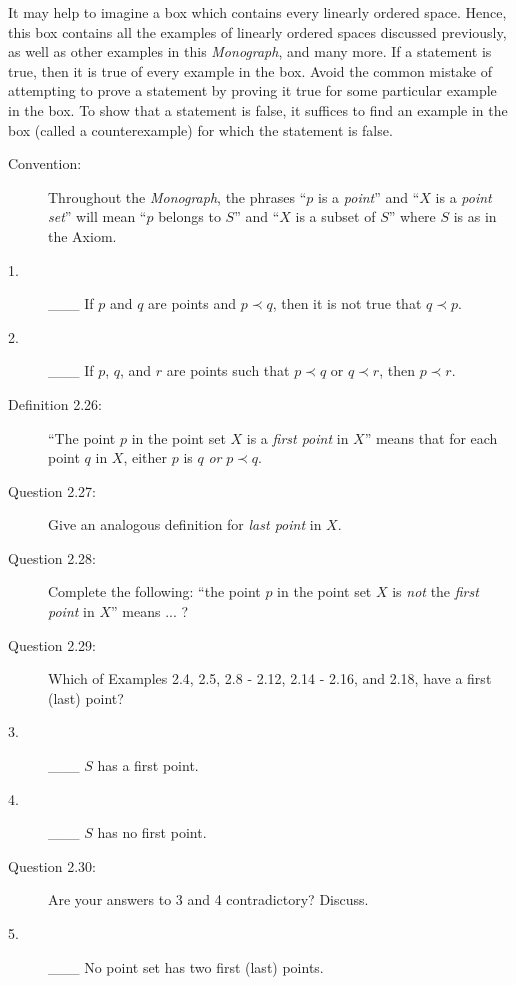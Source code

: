 \documentclass{book}
\begin{document}
It may help to imagine a box which contains every linearly ordered space. Hence, this box contains all the examples of linearly ordered spaces discussed previously, as well as other examples in this \emph{Monograph}, and many more. If a statement is true, then it is true of every example in the box. Avoid the common mistake of attempting to prove a statement by proving it true for some particular example in the box. To show that a statement is false, it suffices to find an example in the box (called a counterexample) for which the statement is false.

\begin{description}

\item[Convention:] Throughout the \emph{Monograph}, the phrases ``$p$ is a \emph{point}'' and ``$X$ is a \emph{point set}'' will mean ``$p$ belongs to $S$'' and ``$X$ is a subset of $S$'' where $S$ is as in the Axiom.

\item[1.] \_\_\_ If $p$ and $q$ are points and $p \prec q$, then it is not true that $q \prec p$.

\item[2.] \_\_\_ If $p$, $q$, and $r$ are points such that $p \prec q$ or $q \prec r$, then $p \prec r$.

\item[Definition 2.26:] ``The point $p$ in the point set $X$ is a \emph{first point} in $X$'' means that for each point $q$ in $X$, either $p$ is $q$ \emph{or} $p \prec q$.

\item[Question 2.27:] Give an analogous definition for \emph{last point} in $X$.

\item[Question 2.28:] Complete the following: ``the point $p$ in the point set $X$ is \emph{not} the \emph{first point} in $X$'' means ... ?

\item[Question 2.29:] Which of Examples 2.4, 2.5, 2.8 - 2.12, 2.14 - 2.16, and 2.18, have a first (last) point?

\item[3.] \_\_\_ $S$ has a first point.

\item[4.] \_\_\_ $S$ has no first point.

\item[Question 2.30:] Are your answers to 3 and 4 contradictory? Discuss.

\item[5.] \_\_\_ No point set has two first (last) points.


\end{description}
\end{document}
